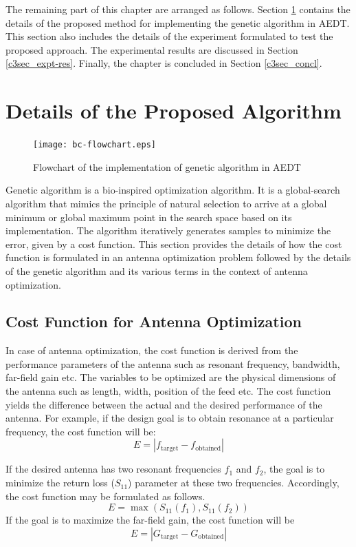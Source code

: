 The remaining part of this chapter are arranged as follows. Section \ref{c3sec-prop-alg} contains the details of the proposed method for implementing the genetic algorithm in AEDT. This section also includes the details of the experiment formulated to test the proposed approach. The experimental results are discussed in Section \ref{c3sec_expt-res}. Finally, the chapter is concluded in Section \ref{c3sec_concl}.

\section{Details of the Proposed Algorithm} \label{c3sec-prop-alg}
\begin{figure}
  \centering
  \texttt{[image: bc-flowchart.eps]}\\
  \caption{Flowchart of the implementation of genetic algorithm in AEDT}\label{fig1}
\end{figure}
Genetic algorithm is a bio-inspired optimization algorithm. It is a global-search algorithm that mimics the principle of natural selection to arrive at a global minimum or global maximum point in the search space based on its implementation. The algorithm iteratively generates samples to minimize the error, given by a cost function. This section provides the details of how the cost function is formulated in an antenna optimization problem followed by the details of the genetic algorithm and its various terms in the context of antenna optimization.

\subsection{Cost Function for Antenna Optimization}
In case of antenna optimization, the cost function is derived from the performance parameters of the antenna such as resonant frequency, bandwidth, far-field gain etc. The variables to be optimized are the physical dimensions of the antenna such as length, width, position of the feed etc. The cost function yields the difference between the actual and the desired performance of the antenna. For example, if the design goal is to obtain resonance at a particular frequency, the cost function will be:
\begin{equation}
E = \left|f_{\textrm{target}}-f_{\textrm{obtained}}\right|
\end{equation}

If the desired antenna has two resonant frequencies $f_1$ and $f_2$, the goal is to minimize the return loss ($S_{11}$) parameter at these two frequencies. Accordingly, the cost function may be formulated as follows.
\begin{equation}
E = \max\left(S_{11}(f_1), S_{11}(f_2)\right)
\end{equation}
If the goal is to maximize the far-field gain, the cost function will be
\begin{equation}
E = \left|G_{\textrm{target}}-G_{\textrm{obtained}}\right|
\end{equation}


